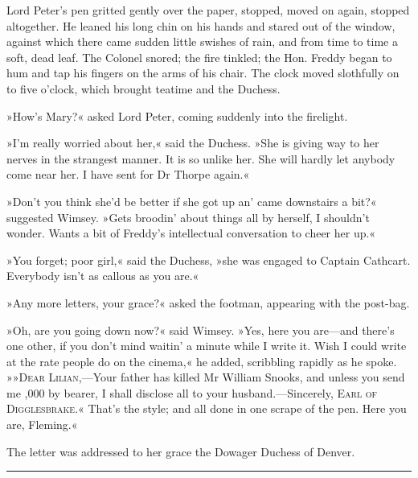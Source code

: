 Lord Peter's pen gritted gently over the paper, stopped, moved on again, stopped altogether. He leaned his long chin on his hands and stared out of the window, against which there came sudden little swishes of rain, and from time to time a soft, dead leaf. The Colonel snored; the fire tinkled; the Hon. Freddy began to hum and tap his fingers on the arms of his chair. The clock moved slothfully on to five o'clock, which brought teatime and the Duchess.

»How's Mary?« asked Lord Peter, coming suddenly into the firelight.

»I'm really worried about her,« said the Duchess. »She is giving way to her nerves in the strangest manner. It is so unlike her. She will hardly let anybody come near her. I have sent for Dr Thorpe again.«

»Don't you think she'd be better if she got up an' came downstairs a bit?« suggested Wimsey. »Gets broodin' about things all by herself, I shouldn't wonder. Wants a bit of Freddy's intellectual conversation to cheer her up.«

»You forget; poor girl,« said the Duchess, »she was engaged to Captain Cathcart. Everybody isn't as callous as you are.«

»Any more letters, your grace?« asked the footman, appearing with the post-bag.

»Oh, are you going down now?« said Wimsey. »Yes, here you are—and there's one other, if you don't mind waitin' a minute while I write it. Wish I could write at the rate people do on the cinema,« he added, scribbling rapidly as he spoke. »»\textsc{Dear Lilian},—Your father has killed Mr William Snooks, and unless you send me ,000 by bearer, I shall disclose all to your husband.—Sincerely, \textsc{Earl of Digglesbrake}.« That's the style; and all done in one scrape of the pen. Here you are, Fleming.«

The letter was addressed to her grace the Dowager Duchess of Denver.

\noindent\hfil\rule{0.5\textwidth}{.4pt}\hfil

\makeatletter
{}
{%
\clearpage
}{%

}
\makeatother

